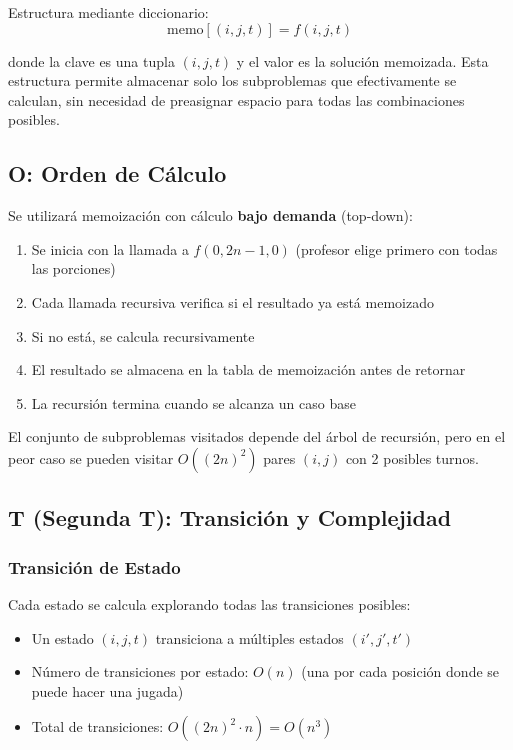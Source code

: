 \documentclass[12pt,letterpaper]{article}
\begin{document}
Estructura mediante diccionario:
\[
\text{memo}[(i, j, t)] = f(i, j, t)
\]

donde la clave es una tupla $(i, j, t)$ y el valor es la solución memoizada. Esta estructura permite almacenar solo los subproblemas que efectivamente se calculan, sin necesidad de preasignar espacio para todas las combinaciones posibles.

\subsection{O: Orden de Cálculo}

Se utilizará memoización con cálculo \textbf{bajo demanda} (top-down):

\begin{enumerate}
    \item Se inicia con la llamada a $f(0, 2n-1, 0)$ (profesor elige primero con todas las porciones)
    \item Cada llamada recursiva verifica si el resultado ya está memoizado
    \item Si no está, se calcula recursivamente
    \item El resultado se almacena en la tabla de memoización antes de retornar
    \item La recursión termina cuando se alcanza un caso base
\end{enumerate}

El conjunto de subproblemas visitados depende del árbol de recursión, pero en el peor caso se pueden visitar $O((2n)^2)$ pares $(i, j)$ con 2 posibles turnos.

\subsection{T (Segunda T): Transición y Complejidad}

\subsubsection{Transición de Estado}

Cada estado se calcula explorando todas las transiciones posibles:
\begin{itemize}
    \item Un estado $(i, j, t)$ transiciona a múltiples estados $(i', j', t')$
    \item Número de transiciones por estado: $O(n)$ (una por cada posición donde se puede hacer una jugada)
    \item Total de transiciones: $O((2n)^2 \cdot n) = O(n^3)$
\end{itemize}
\end{document}
